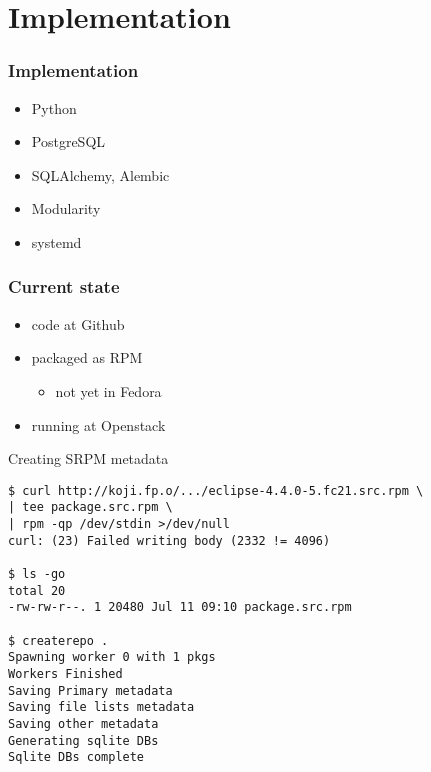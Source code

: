 \documentclass[pdftex,unicode,xcolor=table]{beamer}
\begin{document}
\section{Implementation}
\begin{frame}
  \frametitle{Implementation}
  \begin{itemize}
    \item Python
    \item PostgreSQL
    \item SQLAlchemy, Alembic
    \item Modularity
    \item systemd
  \end{itemize}
\end{frame}

\begin{frame}
  \frametitle{Current state}
  \begin{itemize}
    \item code at Github
    \item packaged as RPM
    \begin{itemize}
      \item not yet in Fedora
    \end{itemize}
    \item running at Openstack
  \end{itemize}
\end{frame}

\small
\begin{frame}[fragile]
\begin{block}{Creating SRPM metadata}
\begin{verbatim}
$ curl http://koji.fp.o/.../eclipse-4.4.0-5.fc21.src.rpm \
| tee package.src.rpm \
| rpm -qp /dev/stdin >/dev/null
curl: (23) Failed writing body (2332 != 4096)

$ ls -go
total 20
-rw-rw-r--. 1 20480 Jul 11 09:10 package.src.rpm

$ createrepo .
Spawning worker 0 with 1 pkgs
Workers Finished
Saving Primary metadata
Saving file lists metadata
Saving other metadata
Generating sqlite DBs
Sqlite DBs complete
\end{verbatim}
\end{block}
\end{frame}
\end{document}
